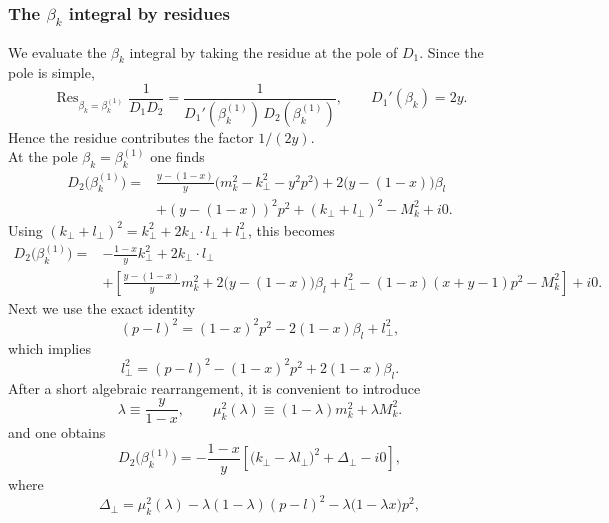 \documentclass[11pt]{article}
\begin{document}
\subsubsection{The $\beta_k$ integral by residues}

We evaluate the $\beta_k$ integral by taking the residue at the pole of $D_1$. Since the pole is simple,
\[
\operatorname{Res}_{\beta_k=\beta_k^{(1)}}\frac{1}{D_1D_2}
=
\frac{1}{D_1'(\beta_k^{(1)})\,D_2(\beta_k^{(1)})},
\qquad D_1'(\beta_k)=2y.
\]
Hence the residue contributes the factor $1/(2y)$.
\\
At the pole $\beta_k=\beta_k^{(1)}$ one finds
\begin{align}
D_2\bigl(\beta_k^{(1)}\bigr)
={}&
\frac{y-(1-x)}{y}\bigl(m_k^2-k_\perp^2-y^2p^2\bigr)
+2\bigl(y-(1-x)\bigr)\beta_l
\nonumber\\
&
+(y-(1-x))^2p^2+(k_\perp+l_\perp)^2-M_k^2+i0.
\label{eq:D2atpole1}
\end{align}
Using $(k_\perp+l_\perp)^2=k_\perp^2+2k_\perp\cdot l_\perp+l_\perp^2$, this becomes
\begin{align}
D_2\bigl(\beta_k^{(1)}\bigr)
={}&
-\frac{1-x}{y}k_\perp^2+2k_\perp\cdot l_\perp
\nonumber\\
&+
\left[
\frac{y-(1-x)}{y}m_k^2+2\bigl(y-(1-x)\bigr)\beta_l+l_\perp^2-(1-x)(x+y-1)p^2-M_k^2
\right]
+i0.
\label{eq:D2atpole2}
\end{align}
Next we use the exact identity
\begin{equation}
(p-l)^2=(1-x)^2p^2-2(1-x)\beta_l+l_\perp^2,
\label{eq:plsq}
\end{equation}
which implies
\[
l_\perp^2=(p-l)^2-(1-x)^2p^2+2(1-x)\beta_l.
\]
After a short algebraic rearrangement, it is convenient to introduce
\begin{equation}
\lambda\equiv \frac{y}{1-x},
\qquad
\mu_k^2(\lambda)\equiv (1-\lambda)m_k^2+\lambda M_k^2.
\label{eq:lambda}
\end{equation}
and one obtains
\begin{equation}
D_2\bigl(\beta_k^{(1)}\bigr)
=-\frac{1-x}{y}
\left[
\bigl(k_\perp-\lambda l_\perp\bigr)^2+\Delta_\perp-i0
\right],
\label{eq:D2factorized}
\end{equation}
where
\begin{equation}
\Delta_\perp
=
\mu_k^2(\lambda)-\lambda(1-\lambda)(p-l)^2-\lambda\bigl(1-\lambda x\bigr)p^2,
\label{eq:Deltaperp}
\end{equation}
\end{document}
